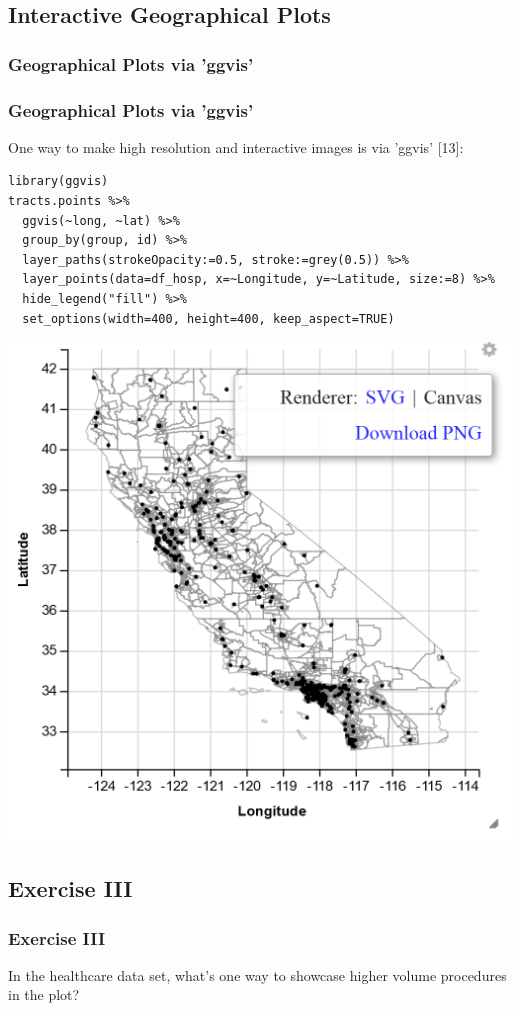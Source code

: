\subsection{Interactive Geographical Plots}
\subsubsection{Geographical Plots via 'ggvis'}
\begin{frame}
	\frametitle{Geographical Plots via 'ggvis'}
One way to make high resolution and interactive images is via 'ggvis' [13]:

\begin{lstlisting}
library(ggvis)
tracts.points %>%
  ggvis(~long, ~lat) %>%
  group_by(group, id) %>%
  layer_paths(strokeOpacity:=0.5, stroke:=grey(0.5)) %>%
  layer_points(data=df_hosp, x=~Longitude, y=~Latitude, size:=8) %>%
  hide_legend("fill") %>%
  set_options(width=400, height=400, keep_aspect=TRUE)
\end{lstlisting}

\newpage
       \begin{center}
		\includegraphics[scale=0.65]{images/shapefile_v2.png}
	\end{center}
\end{frame}

\subsection{Exercise III}
\begin{frame}
	\frametitle{Exercise III}
	In the healthcare data set, what's one way to showcase higher volume procedures in the plot?  
\end{frame}
